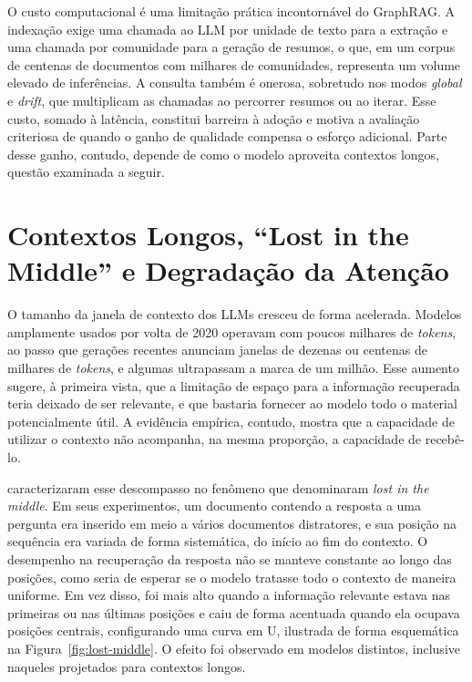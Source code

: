 O custo computacional é uma limitação prática incontornável do GraphRAG. A indexação exige uma chamada ao LLM por unidade de texto para a extração e uma chamada por comunidade para a geração de resumos, o que, em um corpus de centenas de documentos com milhares de comunidades, representa um volume elevado de inferências. A consulta também é onerosa, sobretudo nos modos \textit{global} e \textit{drift}, que multiplicam as chamadas ao percorrer resumos ou ao iterar. Esse custo, somado à latência, constitui barreira à adoção e motiva a avaliação criteriosa de quando o ganho de qualidade compensa o esforço adicional. Parte desse ganho, contudo, depende de como o modelo aproveita contextos longos, questão examinada a seguir.

\section{Contextos Longos, ``Lost in the Middle'' e Degradação da Atenção}\label{sec:contextos-longos}

O tamanho da janela de contexto dos LLMs cresceu de forma acelerada. Modelos amplamente usados por volta de 2020 operavam com poucos milhares de \textit{tokens}, ao passo que gerações recentes anunciam janelas de dezenas ou centenas de milhares de \textit{tokens}, e algumas ultrapassam a marca de um milhão. Esse aumento sugere, à primeira vista, que a limitação de espaço para a informação recuperada teria deixado de ser relevante, e que bastaria fornecer ao modelo todo o material potencialmente útil. A evidência empírica, contudo, mostra que a capacidade de utilizar o contexto não acompanha, na mesma proporção, a capacidade de recebê-lo.

\citet{liu2024} caracterizaram esse descompasso no fenômeno que denominaram \textit{lost in the middle}. Em seus experimentos, um documento contendo a resposta a uma pergunta era inserido em meio a vários documentos distratores, e sua posição na sequência era variada de forma sistemática, do início ao fim do contexto. O desempenho na recuperação da resposta não se manteve constante ao longo das posições, como seria de esperar se o modelo tratasse todo o contexto de maneira uniforme. Em vez disso, foi mais alto quando a informação relevante estava nas primeiras ou nas últimas posições e caiu de forma acentuada quando ela ocupava posições centrais, configurando uma curva em U, ilustrada de forma esquemática na Figura~\ref{fig:lost-middle}. O efeito foi observado em modelos distintos, inclusive naqueles projetados para contextos longos.

